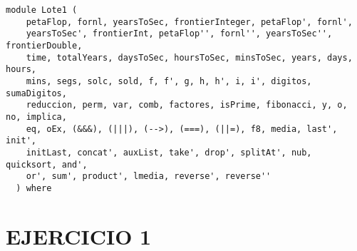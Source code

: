 \label{module:Lote1}
\haddockbeginheader
{\haddockverb\begin{verbatim}
module Lote1 (
    petaFlop, fornl, yearsToSec, frontierInteger, petaFlop', fornl',
    yearsToSec', frontierInt, petaFlop'', fornl'', yearsToSec'', frontierDouble,
    time, totalYears, daysToSec, hoursToSec, minsToSec, years, days, hours,
    mins, segs, solc, sold, f, f', g, h, h', i, i', digitos, sumaDigitos,
    reduccion, perm, var, comb, factores, isPrime, fibonacci, y, o, no, implica,
    eq, oEx, (&&&), (|||), (-->), (===), (||=), f8, media, last', init',
    initLast, concat', auxList, take', drop', splitAt', nub, quicksort, and',
    or', sum', product', lmedia, reverse', reverse''
  ) where\end{verbatim}}
\haddockendheader

\section{EJERCICIO 1}

